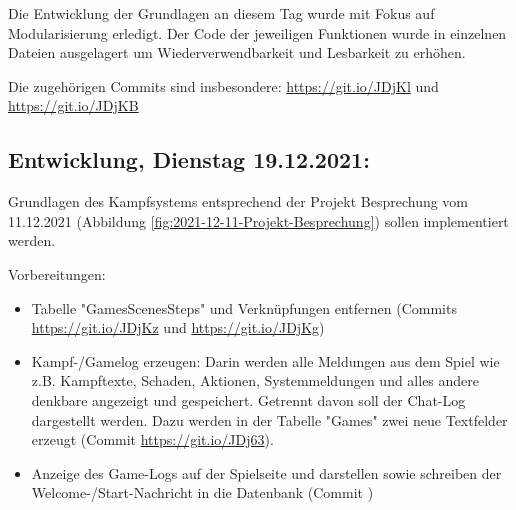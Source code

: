 Die Entwicklung der Grundlagen an diesem Tag wurde mit Fokus auf Modularisierung erledigt. Der Code der jeweiligen Funktionen wurde in einzelnen Dateien ausgelagert um Wiederverwendbarkeit und Lesbarkeit zu erhöhen. 

Die zugehörigen Commits sind insbesondere: 
\url{https://git.io/JDjKl} und 
\url{https://git.io/JDjKB}


\subsection{Entwicklung, Dienstag 19.12.2021:}

Grundlagen des Kampfsystems entsprechend der Projekt Besprechung vom 11.12.2021 (Abbildung \ref{fig:2021-12-11-Projekt-Besprechung}) sollen implementiert werden.

Vorbereitungen: 

\begin{itemize}
    \item Tabelle "GamesScenesSteps" und Verknüpfungen entfernen (Commits \url{https://git.io/JDjKz} und \url{https://git.io/JDjKg})
    \item Kampf-/Gamelog erzeugen: Darin werden alle Meldungen aus dem Spiel wie z.B. Kampftexte, Schaden, Aktionen, Systemmeldungen und alles andere denkbare angezeigt und gespeichert. Getrennt davon soll der Chat-Log dargestellt werden. Dazu werden in der Tabelle "Games" zwei neue Textfelder erzeugt (Commit \url{https://git.io/JDj63}). 
    \item Anzeige des Game-Logs auf der Spielseite und darstellen sowie schreiben der Welcome-/Start-Nachricht in die Datenbank (Commit )
\end{itemize}
